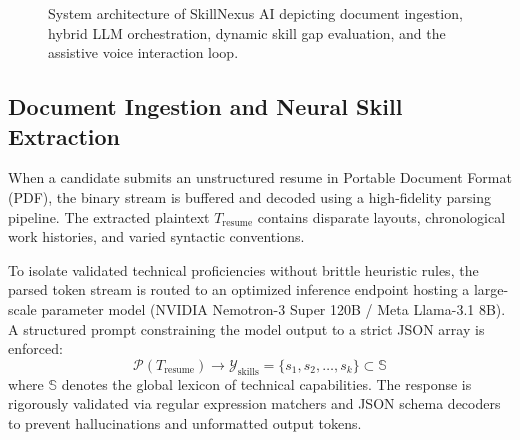 \documentclass[conference]{IEEEtran}
\begin{document}
\begin{figure}[!t]
\caption{System architecture of SkillNexus AI depicting document ingestion, hybrid LLM orchestration, dynamic skill gap evaluation, and the assistive voice interaction loop.}
\label{fig:arch}
\end{figure}

\subsection{Document Ingestion and Neural Skill Extraction}
When a candidate submits an unstructured resume in Portable Document Format (PDF), the binary stream is buffered and decoded using a high-fidelity parsing pipeline. The extracted plaintext $T_{\text{resume}}$ contains disparate layouts, chronological work histories, and varied syntactic conventions.

To isolate validated technical proficiencies without brittle heuristic rules, the parsed token stream is routed to an optimized inference endpoint hosting a large-scale parameter model (NVIDIA Nemotron-3 Super 120B / Meta Llama-3.1 8B). A structured prompt constraining the model output to a strict JSON array is enforced:
\begin{equation}
\mathcal{P}(T_{\text{resume}}) \rightarrow \mathcal{Y}_{\text{skills}} = \{s_1, s_2, \dots, s_k\} \subset \mathbb{S}
\end{equation}
where $\mathbb{S}$ denotes the global lexicon of technical capabilities. The response is rigorously validated via regular expression matchers and JSON schema decoders to prevent hallucinations and unformatted output tokens.
\end{document}
